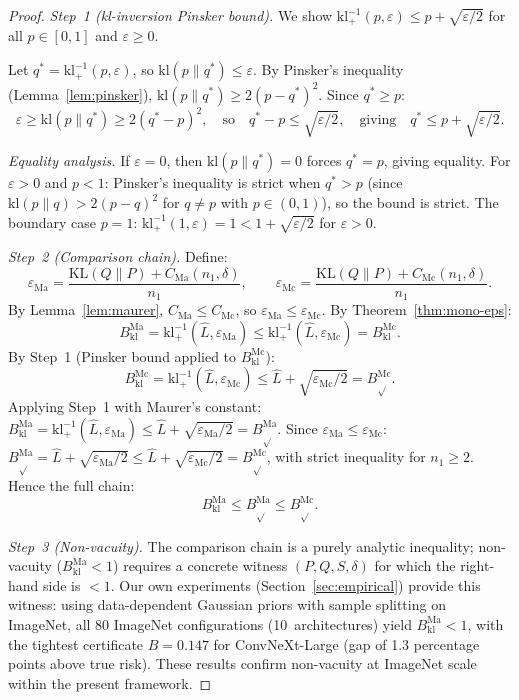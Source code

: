 \documentclass[11pt,a4paper]{article}
\newcommand{\kl}{\mathrm{kl}}
\newcommand{\KL}{\mathrm{KL}}
\newcommand{\klinv}{\kl^{-1}_+}
\begin{document}
\begin{proof}
\emph{Step~1 (kl-inversion Pinsker bound).} We show $\klinv(p,\varepsilon) \le p + \sqrt{\varepsilon/2}$ for all $p \in [0,1]$ and $\varepsilon \ge 0$.

Let $q^* = \klinv(p,\varepsilon)$, so $\kl(p\|q^*) \le \varepsilon$. By Pinsker's inequality (Lemma~\ref{lem:pinsker}), $\kl(p\|q^*) \ge 2(p - q^*)^2$. Since $q^* \ge p$:
\[
\varepsilon \ge \kl(p\|q^*) \ge 2(q^* - p)^2, \quad\text{so}\quad q^* - p \le \sqrt{\varepsilon/2}, \quad\text{giving}\quad q^* \le p + \sqrt{\varepsilon/2}.
\]

\emph{Equality analysis.} If $\varepsilon = 0$, then $\kl(p\|q^*) = 0$ forces $q^* = p$, giving equality. For $\varepsilon > 0$ and $p < 1$: Pinsker's inequality is strict when $q^* > p$ (since $\kl(p\|q) > 2(p-q)^2$ for $q \ne p$ with $p \in (0,1)$), so the bound is strict. The boundary case $p = 1$: $\klinv(1,\varepsilon) = 1 < 1 + \sqrt{\varepsilon/2}$ for $\varepsilon > 0$.

\emph{Step~2 (Comparison chain).} Define:
\[
\varepsilon_{\mathrm{Ma}} = \frac{\KL(Q\|P) + C_{\mathrm{Ma}}(n_1, \delta)}{n_1}, \qquad \varepsilon_{\mathrm{Mc}} = \frac{\KL(Q\|P) + C_{\mathrm{Mc}}(n_1, \delta)}{n_1}.
\]
By Lemma~\ref{lem:maurer}, $C_{\mathrm{Ma}} \le C_{\mathrm{Mc}}$, so $\varepsilon_{\mathrm{Ma}} \le \varepsilon_{\mathrm{Mc}}$. By Theorem~\ref{thm:mono-eps}:
\[
B_{\kl}^{\mathrm{Ma}} = \klinv(\hat{L}, \varepsilon_{\mathrm{Ma}}) \le \klinv(\hat{L}, \varepsilon_{\mathrm{Mc}}) = B_{\kl}^{\mathrm{Mc}}.
\]
By Step~1 (Pinsker bound applied to $B_{\kl}^{\mathrm{Mc}}$):
\[
B_{\kl}^{\mathrm{Mc}} = \klinv(\hat{L}, \varepsilon_{\mathrm{Mc}}) \le \hat{L} + \sqrt{\varepsilon_{\mathrm{Mc}}/2} = B_{\sqrt{}}^{\mathrm{Mc}}.
\]
Applying Step~1 with Maurer's constant: $B_{\kl}^{\mathrm{Ma}} = \klinv(\hat{L}, \varepsilon_{\mathrm{Ma}}) \le \hat{L} + \sqrt{\varepsilon_{\mathrm{Ma}}/2} = B_{\sqrt{}}^{\mathrm{Ma}}$. Since $\varepsilon_{\mathrm{Ma}} \le \varepsilon_{\mathrm{Mc}}$: $B_{\sqrt{}}^{\mathrm{Ma}} = \hat{L} + \sqrt{\varepsilon_{\mathrm{Ma}}/2} \le \hat{L} + \sqrt{\varepsilon_{\mathrm{Mc}}/2} = B_{\sqrt{}}^{\mathrm{Mc}}$, with strict inequality for $n_1 \ge 2$. Hence the full chain:
\[
B_{\kl}^{\mathrm{Ma}} \le B_{\sqrt{}}^{\mathrm{Ma}} \le B_{\sqrt{}}^{\mathrm{Mc}}.
\]

\emph{Step~3 (Non-vacuity).} The comparison chain is a purely analytic inequality; non-vacuity ($B_{\kl}^{\mathrm{Ma}} < 1$) requires a concrete witness $(P, Q, S, \delta)$ for which the right-hand side is $< 1$. Our own experiments (Section~\ref{sec:empirical}) provide this witness: using data-dependent Gaussian priors with sample splitting on ImageNet, all 80 ImageNet configurations (10~architectures) yield $B_{\kl}^{\mathrm{Ma}} < 1$, with the tightest certificate $B = 0.147$ for ConvNeXt-Large (gap of 1.3 percentage points above true risk). These results confirm non-vacuity at ImageNet scale within the present framework.
\end{proof}
\end{document}
